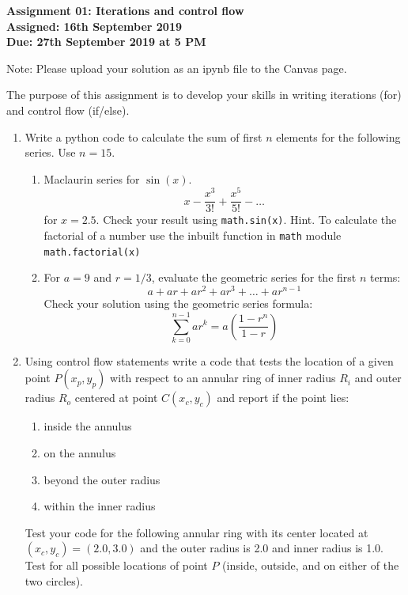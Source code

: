 \documentclass[a4paper,12pt]{article}
\begin{document}
\begin{centering}
	\textbf{
		Assignment 01: Iterations and control flow\\
		Assigned: 16th September 2019\\
		Due: 27th September 2019 at 5 PM\\
	}
\end{centering}


Note: Please upload your solution as an ipynb file to the Canvas page.

\vspace{1em}
 
 The purpose of this assignment is to develop your skills in writing iterations (for) and control flow (if/else).
 
\begin{enumerate}
	\item Write a python code to calculate the sum of first $n$ elements for the following series. Use $n = 15$.
	\begin{enumerate}
		\item Maclaurin series for $\sin(x)$. 
		\begin{equation*}
		x - \frac{x^3}{3!} + \frac{x^5}{5!} - \dots
		\end{equation*}
		for $x = 2.5$. Check your result using \verb|math.sin(x)|.	Hint. To calculate the factorial of a number use the inbuilt function in \verb|math| module \verb|math.factorial(x)|
		\item For $a = 9$ and $r = 1/3$, evaluate the geometric series for the first $n$ terms:
		\begin{equation*}
		a + ar + ar^2 + ar^3 + \dots + ar^{n - 1}
		\end{equation*}
		Check your solution using the geometric series formula:
		\begin{equation*}
			\sum_{k = 0}^{n - 1} ar^k = a \left(\frac{1 -r^n}{1-r}\right)
		\end{equation*}
		
	\end{enumerate}


	
	\item Using control flow  statements write a code that tests the location of a given point $P(x_p, y_p)$ with respect to an annular ring of inner radius $R_i$ and outer radius $R_o$ centered at point $C (x_c, y_c)$ and report if the point lies:
	\begin{enumerate}
		\item inside the annulus
		\item on the annulus
		\item beyond the outer radius
		\item within the inner radius
	\end{enumerate}
	 Test your code for the following annular ring with its center located at $(x_c, y_c) = (2.0, 3.0)$ and the outer radius is 2.0 and inner radius is 1.0. Test for all possible locations of point $P$ (inside, outside, and on either
	 of the two circles).
	

\end{enumerate}
\end{document}

